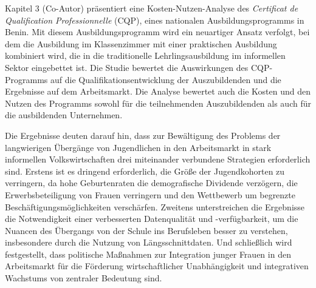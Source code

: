 Kapitel 3 (Co-Autor) präsentiert eine Kosten-Nutzen-Analyse des \textit{Certificat de Qualification Professionnelle} (CQP), eines nationalen Ausbildungsprogramms in Benin. Mit diesem Ausbildungsprogramm wird ein neuartiger Ansatz verfolgt, bei dem die Ausbildung im Klassenzimmer mit einer praktischen Ausbildung kombiniert wird, die in die traditionelle Lehrlingsausbildung im informellen Sektor eingebettet ist. Die Studie bewertet die Auswirkungen des CQP-Programms auf die Qualifikationsentwicklung der Auszubildenden und die Ergebnisse auf dem Arbeitsmarkt. Die Analyse bewertet auch die Kosten und den Nutzen des Programms sowohl für die teilnehmenden Auszubildenden als auch für die ausbildenden Unternehmen.

Die Ergebnisse deuten darauf hin, dass zur Bewältigung des Problems der langwierigen Übergänge von Jugendlichen in den Arbeitsmarkt in stark informellen Volkswirtschaften drei miteinander verbundene Strategien erforderlich sind. Erstens ist es dringend erforderlich, die Größe der Jugendkohorten zu verringern, da hohe Geburtenraten die demografische Dividende verzögern, die Erwerbsbeteiligung von Frauen verringern und den Wettbewerb um begrenzte Beschäftigungsmöglichkeiten verschärfen. Zweitens unterstreichen die Ergebnisse die Notwendigkeit einer verbesserten Datenqualität und -verfügbarkeit, um die Nuancen des Übergangs von der Schule ins Berufsleben besser zu verstehen, insbesondere durch die Nutzung von Längsschnittdaten. Und schließlich wird festgestellt, dass politische Maßnahmen zur Integration junger Frauen in den Arbeitsmarkt für die Förderung wirtschaftlicher Unabhängigkeit und integrativen Wachstums von zentraler Bedeutung sind.